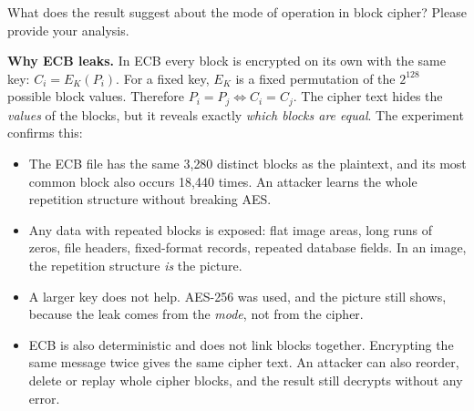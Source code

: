 \documentclass[a4paper, 10pt]{article}
\begin{document}
\begin{problem}
\begin{subproblems_alpha}
	\item What does the result suggest about the mode of operation in block cipher?
	      Please provide your analysis.
	      \myspace[v][3][mm]
	      \begin{solution}
		      \textbf{Why ECB leaks.}
		      In ECB every block is encrypted on its own with the same key: $C_i = E_K(P_i)$.
		      For a fixed key, $E_K$ is a fixed permutation of the $2^{128}$ possible block values.
		      Therefore $P_i = P_j \iff C_i = C_j$.
		      The cipher text hides the \emph{values} of the blocks, but it reveals exactly \emph{which blocks are equal}.
		      The experiment confirms this:
		      \begin{itemize}
			      \item The ECB file has the same 3{,}280 distinct blocks as the plaintext, and its most common block also occurs 18{,}440 times.
			            An attacker learns the whole repetition structure without breaking AES.
			      \item Any data with repeated blocks is exposed: flat image areas, long runs of zeros, file headers, fixed-format records, repeated database fields.
			            In an image, the repetition structure \emph{is} the picture.
			      \item A larger key does not help.
			            AES-256 was used, and the picture still shows, because the leak comes from the \emph{mode}, not from the cipher.
			      \item ECB is also deterministic and does not link blocks together.
			            Encrypting the same message twice gives the same cipher text.
			            An attacker can also reorder, delete or replay whole cipher blocks, and the result still decrypts without any error.
		      \end{itemize}


\end{solution}
\end{subproblems_alpha}
\end{problem}
\end{document}
